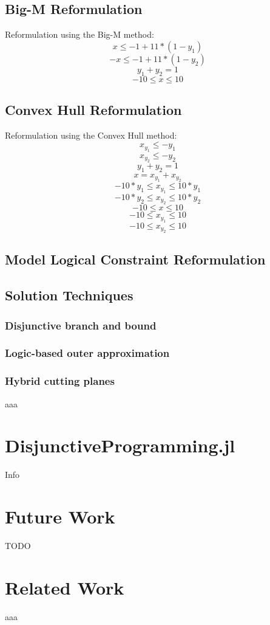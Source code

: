 \documentclass{juliacon}
\begin{document}
\subsection{Big-M Reformulation}
Reformulation using the Big-M method:
\[ x \leq -1 + 11 * (1 - y_1) \]
\[-x \leq -1 + 11 * (1 - y_2) \]
\[y_1 + y_2 = 1 \]
\[-10 \leq x \leq 10\]

\subsection{Convex Hull Reformulation}
Reformulation using the Convex Hull method:
\[x_{y_1} \leq -y_1 \]
\[x_{y_2} \leq -y_2\]
\[y_1 + y_2 = 1\]
\[x = x_{y_1} + x_{y_2}\]
\[-10 * y_1 \leq x_{y_1} \leq 10 * y_1\]
\[-10 * y_2 \leq x_{y_2} \leq 10 * y_2\]
\[-10 \leq x \leq 10\]
\[-10 \leq x_{y_1} \leq 10\]
\[-10 \leq x_{y_2} \leq 10\]

\subsection{Model Logical Constraint Reformulation}

\subsection{Solution Techniques}
\subsubsection{Disjunctive branch and bound}
\subsubsection{Logic-based outer approximation}
\subsubsection{Hybrid cutting planes}
aaa

\section{DisjunctiveProgramming.jl}
Info

\section{Future Work}
TODO

\section{Related Work}
aaa
\end{document}
